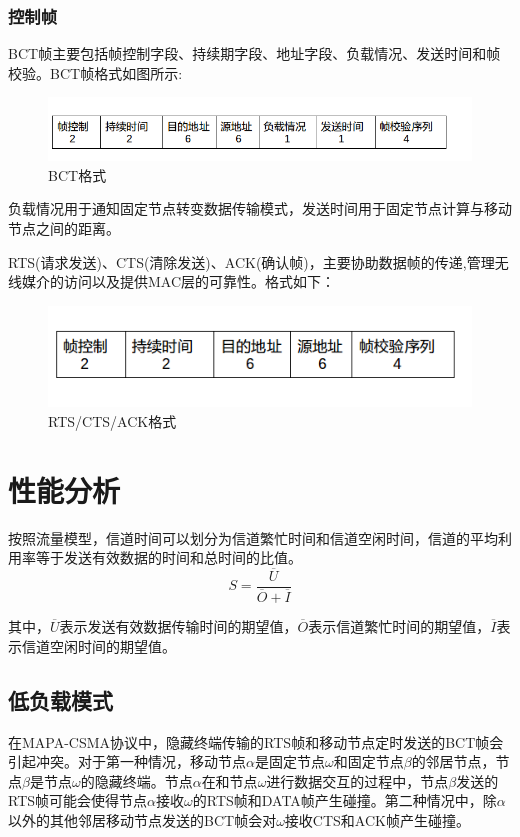 \subsubsection{控制帧}
BCT帧主要包括帧控制字段、持续期字段、地址字段、负载情况、发送时间和帧校验。BCT帧格式如图所示:
\begin{figure}[!ht]
	\centering
	\includegraphics[scale=0.5]{figures/bct.png}
	\caption{
		BCT格式
	}
	\label{fig:example}
\end{figure}
负载情况用于通知固定节点转变数据传输模式，发送时间用于固定节点计算与移动节点之间的距离。

RTS(请求发送)、CTS(清除发送)、ACK(确认帧)，主要协助数据帧的传递,管理无线媒介的访问以及提供MAC层的可靠性。格式如下：
\begin{figure}[!ht]
	\centering
	\includegraphics[scale=0.5]{figures/ctrl.png}
	\caption{
		RTS/CTS/ACK格式
	}
	\label{fig:example}
\end{figure}


\section {性能分析}
按照流量模型，信道时间可以划分为信道繁忙时间和信道空闲时间，信道的平均利用率等于发送有效数据的时间和总时间的比值。
\begin{equation}
S=\frac{\overline U}{\overline O+\overline I}
\end{equation}

其中，$\overline U$表示发送有效数据传输时间的期望值，$\overline O$表示信道繁忙时间的期望值，$\overline I$表示信道空闲时间的期望值。
	
\subsection {低负载模式}
在MAPA-CSMA协议中，隐藏终端传输的RTS帧和移动节点定时发送的BCT帧会引起冲突。对于第一种情况，移动节点$\alpha$是固定节点$\omega$和固定节点$\beta$的邻居节点，节点$\beta$是节点$\omega$的隐藏终端。节点$\alpha$在和节点$\omega$进行数据交互的过程中，节点$\beta$发送的RTS帧可能会使得节点$\alpha$接收$\omega$的RTS帧和DATA帧产生碰撞。第二种情况中，除$\alpha$以外的其他邻居移动节点发送的BCT帧会对$\omega$接收CTS和ACK帧产生碰撞。

